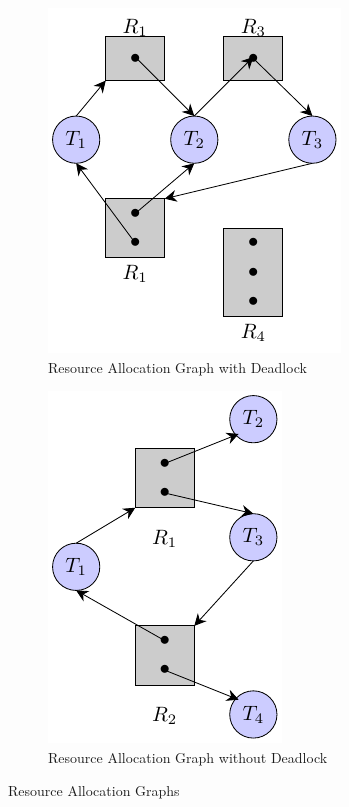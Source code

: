 \documentclass{book/custombook}
\begin{document}
            \begin{figure}[H]
                \centering
                \begin{subfigure}{0.5\linewidth}
                        \centering
                        \includegraphics{figures/deadlock_resource_alloc_graph.pdf}
                        \caption{Resource Allocation Graph with Deadlock}
                \end{subfigure}%
                \begin{subfigure}{0.5\linewidth}
                        \centering
                        \includegraphics{figures/no_deadlock_resource_alloc_graph.pdf}
                        \caption{Resource Allocation Graph without Deadlock}
                \end{subfigure}
                \caption{Resource Allocation Graphs}
            \end{figure}
\end{document}
